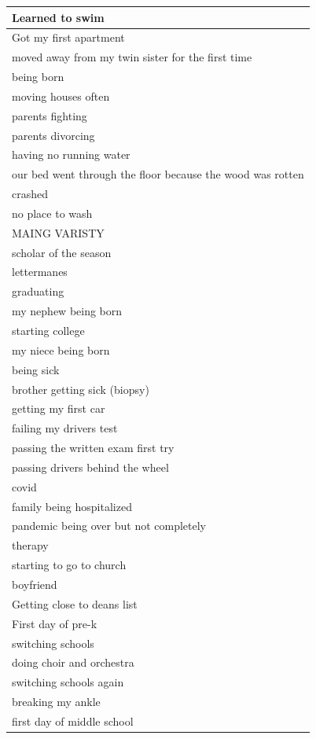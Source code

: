 \documentclass[
  .7em,
  letterpaper,
  DIV=11,
  numbers=noendperiod]{scrartcl}
\begin{document}
\begin{table}
\begin{tabular}{l}
\hline
Learned to swim\\
\hline
Got my first apartment\\
\hline
moved away from my twin sister for the first time\\
\hline
being born\\
\hline
moving houses often\\
\hline
parents fighting\\
\hline
parents divorcing\\
\hline
having no running water\\
\hline
our bed went through the floor because the wood was rotten\\
\hline
crashed\\
\hline
no place to wash\\
\hline
MAING VARISTY\\
\hline
scholar of the season\\
\hline
lettermanes\\
\hline
graduating\\
\hline
my nephew being born\\
\hline
starting college\\
\hline
my niece being born\\
\hline
being sick\\
\hline
brother getting sick (biopsy)\\
\hline
getting my first car\\
\hline
failing my drivers test\\
\hline
passing the written exam first try\\
\hline
passing drivers behind the wheel\\
\hline
covid\\
\hline
family being hospitalized\\
\hline
pandemic being over but not completely\\
\hline
therapy\\
\hline
starting to go to church\\
\hline
boyfriend\\
\hline
Getting close to deans list\\
\hline
First day of pre-k\\
\hline
switching schools\\
\hline
doing choir and orchestra\\
\hline
switching schools again\\
\hline
breaking my ankle\\
\hline
first day of middle school\\

\end{tabular}
\end{table}
\end{document}
